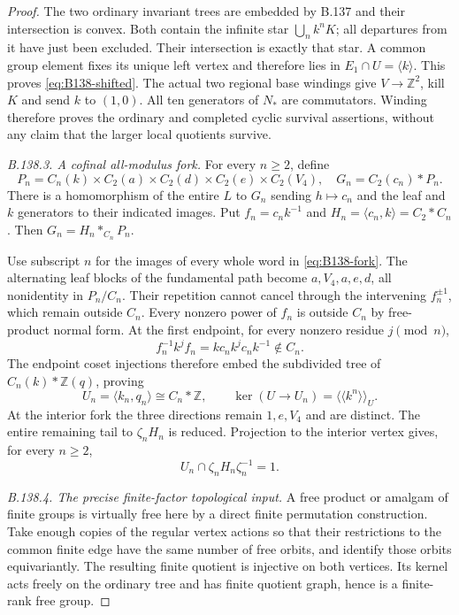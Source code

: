 \begin{proof}
The two ordinary invariant trees are embedded by B.137 and their
intersection is convex. Both contain the infinite star $\bigcup_nk^nK$;
all departures from it have just been excluded. Their intersection
is exactly that star. A common group element fixes its unique left
vertex and therefore lies in $E_1\cap U=\langle k\rangle$.
This proves \eqref{eq:B138-shifted}. The actual two regional base
windings give $V\to\mathbb Z^2$, kill $K$ and send $k$ to $(1,0)$.
All ten generators of $N_*$ are commutators. Winding therefore proves
the ordinary and completed cyclic survival assertions, without any
claim that the larger local quotients survive.

\emph{B.138.3. A cofinal all-modulus fork.}
For every $n\ge2$, define
\[
P_n=C_n(k)\times C_2(a)\times C_2(d)\times C_2(e)\times C_2(V_4),
\quad G_n=C_2(c_n)*P_n.
\]
There is a homomorphism of the entire $L$ to $G_n$ sending
$h\mapsto c_n$ and the leaf and $k$ generators to their indicated
images. Put $f_n=c_nk^{-1}$ and $H_n=\langle c_n,k\rangle=C_2*C_n$.
Then $G_n=H_n*_{C_n}P_n$.

Use subscript $n$ for the images of every whole word in
\eqref{eq:B138-fork}. The alternating leaf blocks of the fundamental
path become $a,V_4,a,e,d$, all nonidentity in $P_n/C_n$.
Their repetition cannot cancel through the intervening $f_n^{\pm1}$,
which remain outside $C_n$. Every nonzero power of $f_n$ is outside
$C_n$ by free-product normal form. At the first endpoint, for every
nonzero residue $j\pmod n$,
\[
f_n^{-1}k^jf_n=kc_nk^jc_nk^{-1}\notin C_n.
\]
The endpoint coset injections therefore embed the subdivided tree
of $C_n(k)*\mathbb Z(q)$, proving
\begin{equation}\label{eq:B138-Un}
U_n=\langle k_n,q_n\rangle\cong C_n*\mathbb Z,\qquad
\ker(U\to U_n)=\langle\!\langle k^n\rangle\!\rangle_U.
\end{equation}
At the interior fork the three directions remain $1,e,V_4$ and are
distinct. The entire remaining tail to $\zeta_nH_n$ is reduced.
Projection to the interior vertex gives, for every $n\ge2$,
\begin{equation}\label{eq:B138-finite-target-intersection}
U_n\cap\zeta_nH_n\zeta_n^{-1}=1.
\end{equation}

\emph{B.138.4. The precise finite-factor topological input.}
A free product or amalgam of finite groups is virtually free here
by a direct finite permutation construction. Take enough copies of
the regular vertex actions so that their restrictions to the common
finite edge have the same number of free orbits, and identify those
orbits equivariantly. The resulting finite quotient is injective on
both vertices. Its kernel acts freely on the ordinary tree and has
finite quotient graph, hence is a finite-rank free group.


\end{proof}
